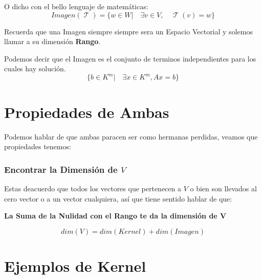 \documentclass[12pt]{report}                                    %
\DeclareMathOperator \LinealTransformation {\mathcal{T}}        %
\begin{document}
        O dicho con el bello lenguaje de matemáticas:
        \begin{equation}
            Imagen(\LinealTransformation) = \{w \in W |\quad \exists v \in V ,\quad \LinealTransformation(v) = w\}
        \end{equation}

        Recuerda que una Imagen siempre siempre sera un Espacio Vectorial y solemos
        llamar a su dimensión \textbf{Rango}.

        Podemos decir que el Imagen es el conjunto de terminos independientes para los cuales
        hay solución.
        \begin{equation*}
            \{b \in K^m |\quad \exists x \in K^m, Ax = b \}
        \end{equation*}

    \clearpage
    \section{Propiedades de Ambas}
        Podemos hablar de que ambas paracen ser como hermanas perdidas,
        veamos que propiedades tenemos:


        \subsubsection{Encontrar la Dimensión de $V$}
            Estas deacuerdo que todos los vectores que pertenecen a $V$ o bien son llevados al cero
            vector o a un vector cualquiera, así que tiene sentido hablar de que: 

            \textbf{La Suma de la Nulidad con el Rango te da la dimensión de V}

            \begin{equation}
                dim(V) = dim(Kernel) + dim(Imagen)
            \end{equation}

    \clearpage
    \section{Ejemplos de Kernel}
\end{document}
